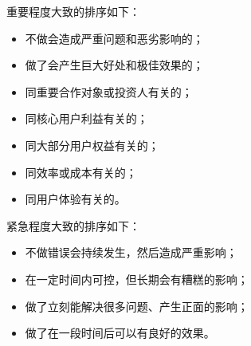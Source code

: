 \documentclass[letterpaper,10pt,english]{sphinxmanual}
\begin{document}
重要程度大致的排序如下：
%
\begin{footnote}[546]\sphinxAtStartFootnote
{}
%
\end{footnote}
\begin{itemize}
\item {} 
不做会造成严重问题和恶劣影响的；

\item {} 
做了会产生巨大好处和极佳效果的；

\item {} 
同重要合作对象或投资人有关的；

\item {} 
同核心用户利益有关的；

\item {} 
同大部分用户权益有关的；

\item {} 
同效率或成本有关的；

\item {} 
同用户体验有关的。

\end{itemize}

紧急程度大致的排序如下：
\begin{itemize}
\item {} 
不做错误会持续发生，然后造成严重影响；

\item {} 
在一定时间内可控，但长期会有糟糕的影响；

\item {} 
做了立刻能解决很多问题、产生正面的影响；

\item {} 
做了在一段时间后可以有良好的效果。

\end{itemize}
\end{document}
